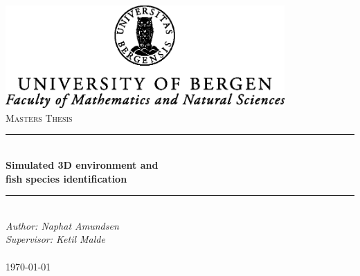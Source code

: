\documentclass[../Main/thesis.tex]{subfiles}
\begin{document}
\newcommand{\HRule}{\rule{\linewidth}{0.5mm}}

\begin{titlepage}
\begin{center}
\includegraphics[width=0.8\textwidth]{../fig/UiBlogoMN_gray_m_Eng.eps} \\[1cm]

\textsc{\huge Masters Thesis}\\[0.4cm]
\HRule \\[0.4cm]
{ \huge \bfseries Simulated 3D environment and \\fish species identification}\\[0.5cm]
\HRule \\[1.0cm]

\emph{Author: Naphat Amundsen}\\
\emph{Supervisor: Ketil Malde}\\

\paragraph*{}
\end{center}
\vfill
\begin{center}
{\large \today}
\end{center}
\end{titlepage}
\end{document}
